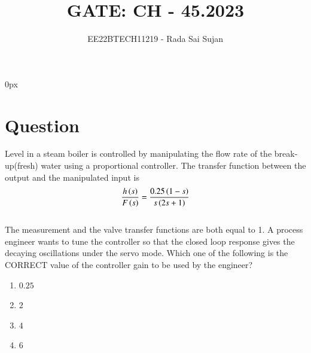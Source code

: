\documentclass[journal,12pt,twocolumn]{IEEEtran}
\theoremstyle{remark}
\begin{document}
\parindent 0px

\title{GATE: CH - 45.2023}
\author{EE22BTECH11219 - Rada Sai Sujan$^{}$%
}
\maketitle
\newpage
\bigskip
\section*{Question}
Level  in a steam boiler is controlled by manipulating the flow rate  of the break-up(fresh) water using a proportional  controller. The transfer function between the output and the manipulated input is   \\
$$ \frac{h\left(s\right)}{F\left(s\right)}=\frac{0.25\left(1-s\right)}{s\left(2s+1\right)} $$   \\
The measurement and the valve transfer functions are both equal to 1. A process engineer wants to tune the controller so that the closed loop response gives the decaying oscillations under the servo mode. Which one of the following is the CORRECT value of the controller gain to be used by the engineer? \\
\begin{enumerate}[label=(\alph*)]
    \item $0.25$
    \item $2$
    \item $4$
    \item $6$
\end{enumerate} \\
\solution
\fi
\end{document}

